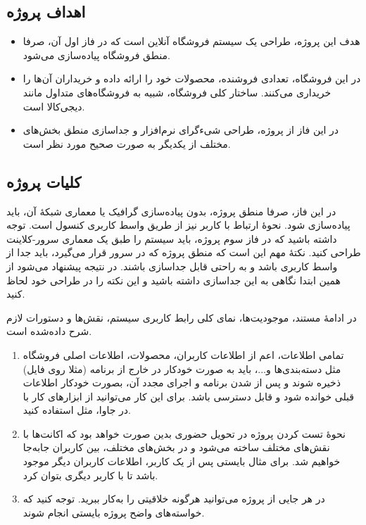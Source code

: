 \documentclass[]{article}
\begin{document}
\subsection*{{\titr اهداف پروژه}}

\begin{itemize}

\item
هدف این پروژه، طراحی یک سیستم فروشگاه آنلاین است که در فاز اول آن، صرفا منطق فروشگاه پیاده‌سازی می‌شود.

\item
در این فروشگاه، تعدادی فروشنده، محصولات خود را ارائه داده و خریداران آن‌ها را خریداری می‌کنند. ساختار کلی فروشگاه، شبیه به فروشگاه‌های متداول مانند دیجی‌کالا است.

\item
در این فاز از پروژه، طراحی شی‌ءگرای نرم‌افزار و جداسازی منطق بخش‌های مختلف از یکدیگر به صورت صحیح مورد نظر است.

\end{itemize}

\subsection*{{\titr کلیات پروژه}}

در این فاز، صرفا منطق پروژه، بدون پیاده‌سازی گرافیک یا معماری شبکهٔ آن، باید پیاده‌سازی شود. نحوهٔ ارتباط با کاربر نیز از طریق واسط کاربری کنسول است. توجه داشته باشید که در فاز سوم پروژه، باید سیستم را طبق یک معماری سرور-کلاینت طراحی کنید. نکتهٔ مهم این است که منطق پروژه که در سرور قرار می‌گیرد، باید جدا از واسط کاربری باشد و به راحتی قابل جداسازی باشند. در نتیجه پیشنهاد می‌شود از همین ابتدا نگاهی به این جداسازی داشته‌ باشید و این نکته را در طراحی خود لحاظ کنید.

در ادامهٔ مستند، موجودیت‌ها، نمای کلی رابط کاربری سیستم، نقش‌ها و دستورات لازم شرح داده‌شده است.

\begin{enumerate}[label={نکته \arabic*:}]
\item
 تمامی اطلاعات، اعم از اطلاعات کاربران، محصولات، اطلاعات اصلی فروشگاه مثل دسته‌بندی‌ها و...، باید به صورت خودکار در خارج از برنامه (مثلا روی فایل) ذخیره شوند و پس از  شدن برنامه و اجرای مجدد آن، بصورت خودکار اطلاعات قبلی خوانده شود و قابل دسترسی باشد. برای این کار می‌توانید از ابزارهای کار با  در جاوا، مثل
  \href{https://www.tutorialspoint.com/gson/gson_quick_guide.htm}{\textcolor{blue}{}}
   استفاده‌ کنید.
\newpage

\item
 نحوهٔ تست کردن پروژه در تحویل حضوری بدین صورت خواهد بود که اکانت‌ها با نقش‌های مختلف ساخته‌ می‌شود و در بخش‌های مختلف، بین کاربران جابه‌جا خواهیم‌ شد. برای مثال بایستی پس از  یک کاربر، اطلاعات کاربران دیگر موجود باشد تا با کاربر دیگری بتوان  کرد.

\item
در هر جایی از پروژه می‌توانید هرگونه خلاقیتی را به‌کار ببرید. توجه کنید که خواسته‌های واضح پروژه بایستی انجام شوند.
\end{enumerate}
\end{document}
